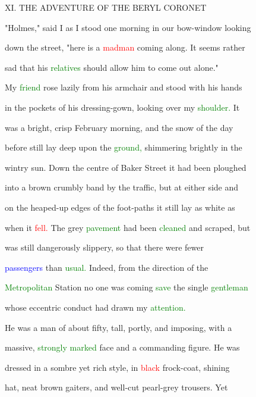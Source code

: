  XI. THE \textcolor{BurntOrange}{ADVENTURE} OF THE BERYL CORONET



 "Holmes," said I as I stood one morning in our bow-window looking

 down the street, "here is a \textcolor{red}{madman} coming along. It seems rather

 sad that his \textcolor{green}{relatives} should allow him to come out alone."



 My \textcolor{green}{friend} rose lazily from his armchair and stood with his hands

 in the pockets of his dressing-gown, looking over my \textcolor{green}{shoulder.} It

 was a bright, \textcolor{BurntOrange}{crisp} February morning, and the snow of the day

 before still lay deep upon the \textcolor{green}{ground,} shimmering brightly in the

 wintry \textcolor{BurntOrange}{sun.} Down the centre of Baker Street it had been ploughed

 into a brown crumbly band by the traffic, but at either side and

 on the heaped-up edges of the foot-paths it still lay as \textcolor{BurntOrange}{white} as

 when it \textcolor{red}{fell.} The grey \textcolor{green}{pavement} had been \textcolor{green}{cleaned} and scraped, but

 was still dangerously slippery, so that there were fewer

 \textcolor{blue}{passengers} than \textcolor{green}{usual.} Indeed, from the direction of the

 \textcolor{green}{Metropolitan} Station no one was coming \textcolor{green}{save} the single \textcolor{green}{gentleman}

 whose eccentric conduct had drawn my \textcolor{green}{attention.}



 He was a man of about fifty, tall, portly, and imposing, with a

 massive, \textcolor{green}{strongly} \textcolor{green}{marked} face and a commanding figure. He was

 dressed in a sombre yet rich style, in \textcolor{red}{black} frock-coat, shining

 hat, neat brown gaiters, and well-cut pearl-grey trousers. Yet

